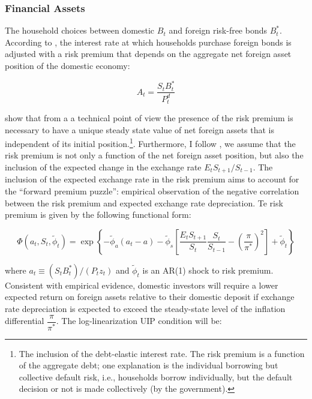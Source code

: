 \documentclass[12pt,oneside,a4paper]{article}
\begin{document}
\subsubsection{Financial Assets}
The household choices between domestic $B_t$ and foreign risk-free bonds $B_t^{*}$. According to \citet{Benigno:2009}, the interest rate at which households purchase foreign bonds is adjusted with a risk premium that depends on the aggregate net foreign asset position of the domestic economy:

\begin{equation}
    A_{t} =\frac{S_{t} B_{t}^{*}}{P_{t}^{d}}
\end{equation}

\citet{Uribe:2003} show that from a  a technical point of view the presence of the risk premium is necessary to have a unique steady state value of net foreign assets that is independent of its initial position.\footnote{The inclusion of the debt-elastic interest rate. The risk premium is a function of the aggregate debt; one explanation is the individual borrowing but collective default risk, i.e., households borrow individually, but the default decision or not is made collectively (by the government). }. Furthermore, I follow \citet{Adolfson:2008}, we assume that the risk premium is not only a function of the net
foreign asset position, but also the inclusion of the expected change in the exchange rate $E_tS_{t+1}/S_{t-1}$.
The inclusion of the expected exchange rate in the risk premium aims to account for the “forward premium puzzle”: empirical observation of the negative correlation between the risk premium and expected exchange rate depreciation. Te risk premium is given by the following functional form:

\begin{equation}
\Phi\left({a_t}, S_{t}, \tilde{\phi}_{t}\right)=\exp \left\{-\tilde{\phi}_{a}\left(a_{t}-a\right)-\tilde{\phi}_{s}\left[\frac{E_{t} S_{t+1}}{S_{t}} \frac{S_{t}}{S_{t-1}}-\left(\frac{\pi}{\pi^{*}}\right)^{2}\right]+\tilde{\phi}_{t}\right\}
\end{equation}

where $a_t \equiv (S_tB_t^{*})/(P_tz_t)$ and $\tilde{\phi}_{t}$ is an AR(1) shock to risk premium. Consistent with empirical evidence, domestic investors will require a lower expected return on foreign assets relative to their domestic deposit if exchange rate depreciation is expected to exceed the steady-state level of the inflation differential $\dfrac{\pi}{\pi^{*}}$. The log-linearization UIP condition will be:
\end{document}
